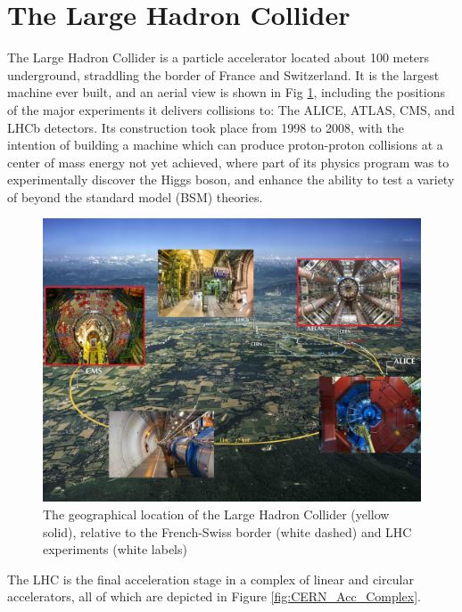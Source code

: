\section{The Large Hadron Collider} \label{sec:LHC}

The Large Hadron Collider is a particle accelerator located about 100 meters underground, straddling the border of France and Switzerland. It is the largest machine ever built, and an aerial view is shown in Fig \ref{fig:LHC_BirdsEye}, including the positions of the major experiments it delivers collisions to: The ALICE, ATLAS, CMS, and LHCb detectors. Its construction took place from 1998 to 2008, with the intention of building a machine which can produce proton-proton collisions at a center of mass energy not yet achieved, where part of its physics program was to experimentally discover the Higgs boson, and enhance the ability to test a variety of beyond the standard model (BSM) theories. 

\begin{figure}[H]
    \centering
    \includegraphics[width=\textwidth]{Images/LHC/LHCCollage_withExperiments.jpeg}
    \caption{The geographical location of the Large Hadron Collider (yellow solid), relative to the French-Swiss border (white dashed) and LHC experiments (white labels)}
    \label{fig:LHC_BirdsEye}
\end{figure}

The LHC is the final acceleration stage in a complex of linear and circular accelerators, all of which are depicted in Figure \ref{fig:CERN_Acc_Complex}. 

